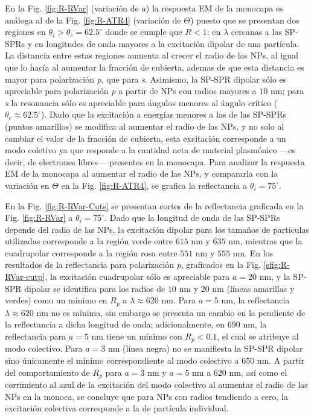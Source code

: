 En la Fig.   \ref{fig:R-RVar} (variación de $a$) la respuesta EM de la monocapa es análoga al de la Fig. \ref{fig:R-ATR4} (variación de $\Theta$) puesto que se presentan  dos regiones en $\theta_i>\theta_c=62.5^\circ$  donde se cumple que $R<1$: en $\lambda$ cercanas a las SP-SPRs y en longitudes de onda mayores a la excitación dipolar de una partícula. La distancia entre estas regiones aumenta al crecer el radio de las NPs, al igual que lo hacía al aumentar la fracción de cubierta, ademas de que esta distancia es mayor para polarización \emph{p}, que para \emph{s}. Asimismo, la SP-SPR dipolar sólo es apreciable para polarización \emph{p} a partir de NPs con radios mayores a $10$ nm; para \emph{s} la resonancia sólo es apreciable para ángulos menores al ángulo crítico ($\theta_c\approx 62.5^\circ$). Dado que la excitación a energías menores a las de las SP-SPRs (puntos amarillos) se modifica al aumentar el radio de las NPs, y no solo al cambiar el valor de la fracción de cubierta, esta excitación corresponde a un modo coletivo ya que responde a la cantidad neta de material plasmónico ---es decir, de electrones libres--- presentes en la monocapa. Para analizar la respuesta EM de la monocapa al aumentar el radio de las NPs, y compararla con la variación en $\Theta$ en la Fig. \ref{fig:R-ATR4},  se grafica la reflectancia a $\theta_i = 75^\circ$. 

En la Fig. \ref{fig:R-RVar-Cuts} se presentan cortes de la reflectancia graficada en la Fig. \ref{fig:R-RVar} a $\theta_i = 75^\circ$. Dado que la longitud de onda de las SP-SPRs depende del radio de las NPs, la excitación dipolar para los tamaños de partículas utilizadas corresponde a la región verde entre $615$ nm y $635$ nm, mientras que la cuadrupolar corresponde a la región rosa entre $551$ nm y $555$ nm.
 En los resultados de la reflectancia para polarización \emph{p}, graficados en la Fig. \ref{sfig:R-RVar-cutp}, la excitación cuadrupolar sólo es apreciable para $a=20$ nm, y la SP-SPR dipolar se identifica para los radios de $10$ nm y $20$ nm (líneas amarillas y verdes) como un mínimo en $R_p$ a $\lambda\approx 620$ nm. Para $a=5$ nm, la reflectancia $\lambda\approx 620$ nm no es mínima, sin embargo se presenta un cambio en la pendiente de la reflectancia a dicha longitud de onda; adicionalmente, en $690$ nm, la reflectancia para $a=5$ nm tiene un mínimo con $R_p<0.1$, el cual se atribuye al modo colectivo. Para $a=3$ nm (línea negra) no se manifiesta la SP-SPR dipolar sino únicamente el mínimo correspondiente al modo colectivo a $650$ nm. A partir del comportamiento de $R_p$ para $a=3$ nm y $a=5$ nm a $620$ nm, así como el corrimiento al azul de la excitación del modo colectivo al aumentar el radio de las NPs en la monoca, se concluye que para NPs con radios tendiendo a cero, la excitación colectiva corresponde a la de partícula individual.
 
